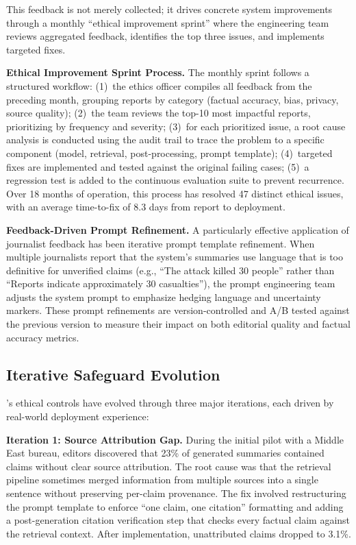 This feedback is not merely collected; it drives concrete system improvements through a monthly ``ethical improvement sprint'' where the engineering team reviews aggregated feedback, identifies the top three issues, and implements targeted fixes.

\textbf{Ethical Improvement Sprint Process.} The monthly sprint follows a structured workflow: (1)~the ethics officer compiles all feedback from the preceding month, grouping reports by category (factual accuracy, bias, privacy, source quality); (2)~the team reviews the top-10 most impactful reports, prioritizing by frequency and severity; (3)~for each prioritized issue, a root cause analysis is conducted using the audit trail to trace the problem to a specific component (model, retrieval, post-processing, prompt template); (4)~targeted fixes are implemented and tested against the original failing cases; (5)~a regression test is added to the continuous evaluation suite to prevent recurrence. Over 18 months of operation, this process has resolved 47 distinct ethical issues, with an average time-to-fix of 8.3 days from report to deployment.

\textbf{Feedback-Driven Prompt Refinement.} A particularly effective application of journalist feedback has been iterative prompt template refinement. When multiple journalists report that the system's summaries use language that is too definitive for unverified claims (e.g., ``The attack killed 30 people'' rather than ``Reports indicate approximately 30 casualties''), the prompt engineering team adjusts the system prompt to emphasize hedging language and uncertainty markers. These prompt refinements are version-controlled and A/B tested against the previous version to measure their impact on both editorial quality and factual accuracy metrics.

\subsection{Iterative Safeguard Evolution}\label{sec:ch11_ishtar_iterations}

\ishtar{}'s ethical controls have evolved through three major iterations, each driven by real-world deployment experience:

\textbf{Iteration 1: Source Attribution Gap.} During the initial pilot with a Middle East bureau, editors discovered that 23\% of generated summaries contained claims without clear source attribution. The root cause was that the retrieval pipeline sometimes merged information from multiple sources into a single sentence without preserving per-claim provenance. The fix involved restructuring the prompt template to enforce ``one claim, one citation'' formatting and adding a post-generation citation verification step that checks every factual claim against the retrieval context. After implementation, unattributed claims dropped to 3.1\%.

